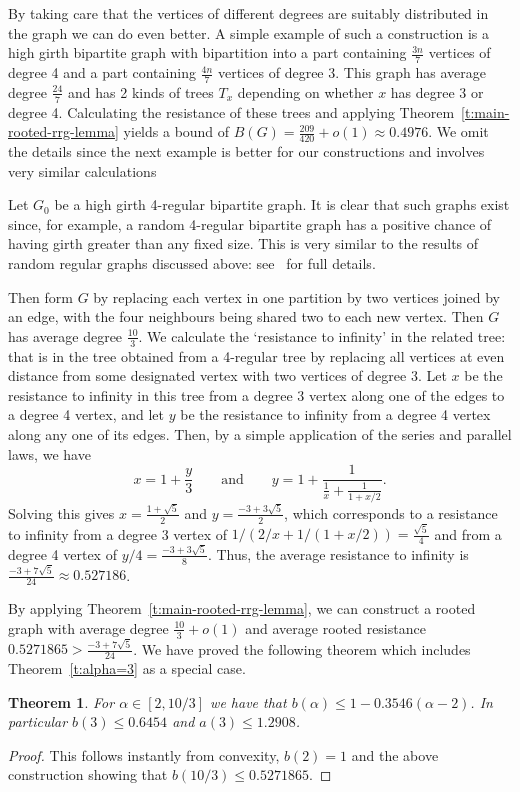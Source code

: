 \documentclass[11pt]{article}
\newtheorem{theorem}{Theorem}
\theoremstyle{remark}
\def\a{\alpha}
\begin{document}
By taking care that the vertices of different degrees are suitably
distributed in the graph we can do even better. A simple example of
such a construction is a high girth bipartite graph with bipartition into a
part containing $\frac{3n}{7}$ vertices of degree 4 and a part
containing $\frac{4n}{7}$ vertices of degree 3. This graph has average
degree $\frac{24}{7}$ and has 2 kinds of trees $T_x$ depending on
whether $x$ has degree 3 or degree 4. Calculating the resistance of
these trees and applying Theorem~\ref{t:main-rooted-rrg-lemma} yields
a bound of $B(G)=\frac{209}{420}+o(1)\approx0.4976$. We omit the
details since the next example is better for our constructions and
involves very similar calculations

Let $G_0$ be a high girth 4-regular bipartite graph. It is clear that
such graphs exist since, for example, a random 4-regular bipartite
graph has a positive chance of having girth greater than any fixed
size. This is very similar to the results of random regular graphs
discussed above: see~\cite{MR1725006} for full details. 

Then form $G$ by replacing each vertex in one partition by two
vertices joined by an edge, with the four neighbours being shared two
to each new vertex. Then $G$ has average degree $\frac{10}{3}$. We
calculate the `resistance to infinity' in the related tree: that is in
the tree obtained from a 4-regular tree by replacing all vertices at
even distance from some designated vertex with two vertices of degree
3. Let $x$ be the resistance to infinity in this tree from a degree 3
vertex along one of the edges to a degree 4 vertex, and let $y$ be the
resistance to infinity from a degree 4 vertex along any one of its
edges. Then, by a simple application of the series and parallel laws, we have
\[
x=1+\frac y3 \qquad\text{and}\qquad y=1+\frac{1}{\frac 1x+\frac1{1+x/2}}.
\]
Solving this gives $x=\frac{1+\sqrt{5}}2$ and $y=\frac{-3+3\sqrt 5}2$,
which corresponds to a resistance to infinity from a degree 3 vertex
of $1/(2/x+1/(1+x/2))=\frac{\sqrt{5}}4$ and from a degree 4 vertex of
$y/4=\frac{-3+3\sqrt 5}8$. Thus, the average resistance to infinity is
$\frac{-3+7\sqrt5}{24}\approx 0.527186$.

By applying Theorem~\ref{t:main-rooted-rrg-lemma}, we can construct a
rooted graph with average degree $\frac{10}{3}+o(1)$ and average rooted
resistance $0.5271865>\frac{-3+7\sqrt5}{24}$. We have proved the following theorem which
includes Theorem~\ref{t:alpha=3} as a special case.
\begin{theorem}\label{mixed:thm}
For $\a\in[2,10/3]$ we have that $b(\a)\leq 1-0.3546(\a-2)$. In particular
  $b(3)\leq 0.6454$ and $a(3)\le 1.2908$.
\end{theorem}
\begin{proof}
  This follows instantly from convexity, $b(2)=1$ and the above
  construction showing that $b(10/3)\le 0.5271865$.
\end{proof}
\end{document}

